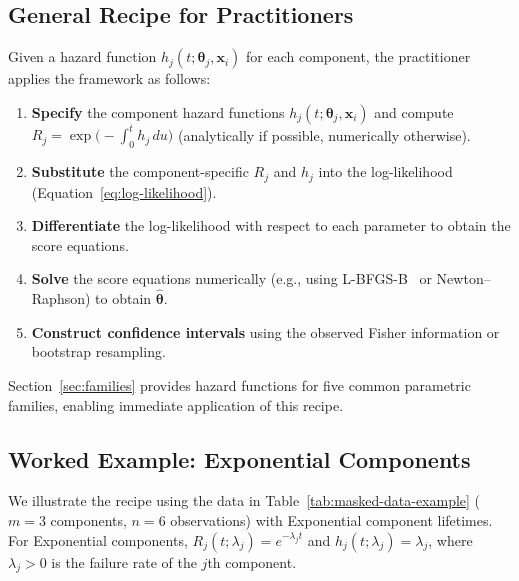 \documentclass[11pt]{article}
\theoremstyle{definition}
\theoremstyle{plain}
\renewcommand{\v}[1]{\boldsymbol{#1}}
\newcommand{\btheta}{\v{\theta}}
\begin{document}
\subsection{General Recipe for Practitioners}
\label{sec:recipe}

Given a hazard function $h_j(t; \v{\theta}_j, \v{x}_i)$ for each
component, the practitioner applies the framework as follows:
\begin{enumerate}
    \item \textbf{Specify} the component hazard functions
    $h_j(t; \v{\theta}_j, \v{x}_i)$ and compute
    $R_j = \exp\!\bigl(-\int_0^t h_j \, du\bigr)$
    (analytically if possible, numerically otherwise).
    \item \textbf{Substitute} the component-specific $R_j$ and $h_j$ into
    the log-likelihood (Equation~\eqref{eq:log-likelihood}).
    \item \textbf{Differentiate} the log-likelihood with respect to each
    parameter to obtain the score equations.
    \item \textbf{Solve} the score equations numerically (e.g., using
    L-BFGS-B~\citep{byrd1995} or Newton--Raphson) to obtain
    $\hat{\btheta}$.
    \item \textbf{Construct confidence intervals} using the observed
    Fisher information or bootstrap resampling.
\end{enumerate}

Section~\ref{sec:families} provides hazard functions for five common
parametric families, enabling immediate application of this recipe.

\subsection{Worked Example: Exponential Components}
\label{sec:worked-example}

We illustrate the recipe using the data in
Table~\ref{tab:masked-data-example} ($m = 3$ components, $n = 6$
observations) with Exponential component lifetimes.
For Exponential components, $R_j(t; \lambda_j) = e^{-\lambda_j t}$
and $h_j(t; \lambda_j) = \lambda_j$, where $\lambda_j > 0$ is the
failure rate of the $j$th component.
\end{document}
